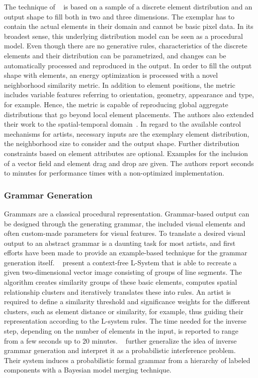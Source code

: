 The technique of \citeauthor*{ma_2011_det}~\cite{ma_2011_det} is based on a sample of a discrete element distribution and an output shape to fill both in two and three dimensions. The exemplar has to contain the actual elements in their domain and cannot be basic pixel data. In its broadest sense, this underlying distribution model can be seen as a procedural model. Even though there are no generative rules, characteristics of the discrete elements and their distribution can be parametrized, and changes can be automatically processed and reproduced in the output. In order to fill the output shape with elements, an energy optimization is processed with a novel neighborhood similarity metric. In addition to element positions, the metric includes  variable features referring to orientation, geometry, appearance and type, for example. Hence, the metric is capable of reproducing global aggregate distributions that go beyond local element placements. The authors also extended their work to the spatial-temporal domain~\cite{ma_2013_det}. In regard to the available control mechanisms for artists, necessary inputs are the exemplary element distribution, the neighborhood size to consider and the output shape. Further distribution constraints based on element attributes are optional. Examples for the inclusion of a vector field and element drag and drop are given. The authors report seconds to minutes for performance times with a non-optimized implementation.

\subsubsection{Grammar Generation}
\label{subsec:analysis_example_based_grammar}

Grammars are a classical procedural representation. Grammar-based output can be designed through the generating grammar, the included visual elements and often custom-made parameters for visual features. To translate a desired visual output to an abstract grammar is a daunting task for most artists, and first efforts have been made to provide an example-based technique for the grammar generation itself.
\citeauthor*{stava_2010_ipm}~\cite{stava_2010_ipm} present a context-free L-System that is able to recreate a given two-dimensional vector image consisting of groups of line segments. The algorithm creates similarity groups of these basic elements, computes spatial relationship clusters and iteratively translates these into rules. An artist is required to define a similarity threshold and significance weights for the different clusters, such as element distance or similarity, for example, thus guiding their representation according to the L-system rules. The time needed for the inverse step, depending on the number of elements in the input, is reported to range from a few seconds up to 20 minutes. \citeauthor*{talton_2012_ldp}~\cite{talton_2012_ldp} further generalize the idea of inverse grammar generation and interpret it as a probabilistic interference problem. Their system induces a probabilistic formal grammar from a hierarchy of labeled components with a Bayesian model merging technique.

